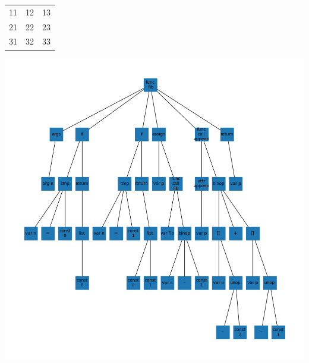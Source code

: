 \documentclass{article}
\begin{document}
\begin{tabular}{ c c c }
11 & 12 & 13 \\
21 & 22 & 23 \\
31 & 32 & 33
\end{tabular}
\includegraphics[width=\linewidth]{artifacts/pic.png}
\end{document}
